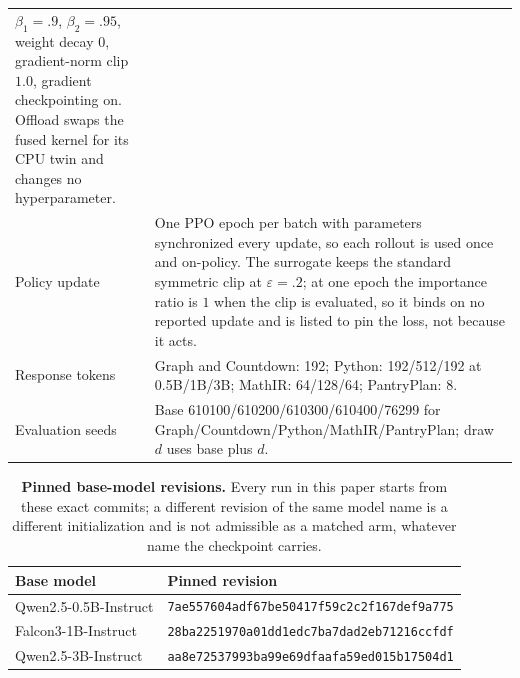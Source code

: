 \documentclass{article}
\newcommand{\1}{\mathbf 1}
\theoremstyle{remark}
\theoremstyle{definition}
\theoremstyle{plain}
\begin{document}
\begin{table}[!htbp]
\begin{tabularx}{\linewidth}{@{}P{.23\linewidth}Y@{}}
      $\beta_1=.9$, $\beta_2=.95$, weight decay $0$, gradient-norm clip $1.0$,
      gradient checkpointing on. Offload swaps the fused kernel for its CPU
      twin and changes no hyperparameter. \\
    Policy update & One PPO epoch per batch with parameters synchronized every
      update, so each rollout is used once and on-policy. The surrogate keeps
      the standard symmetric clip at $\varepsilon=.2$; at one epoch the
      importance ratio is $1$ when the clip is evaluated, so it binds on no
      reported update and is listed to pin the loss, not because it acts. \\
    Response tokens & Graph and Countdown: 192; Python: 192/512/192
      at 0.5B/1B/3B; MathIR: 64/128/64; PantryPlan: 8. \\
    Evaluation seeds & Base 610100/610200/610300/610400/76299 for
      Graph/Countdown/Python/MathIR/PantryPlan; draw $d$ uses base plus $d$. \\
    \bottomrule
  \end{tabularx}
\end{table}

\begin{table}[!htbp]
\centering
\caption{\textbf{Pinned base-model revisions.} Every run in this paper starts
from these exact commits; a different revision of the same model name is a
different initialization and is not admissible as a matched arm, whatever
name the checkpoint carries.}
\label{tab:pinned-revisions}
\small
\begin{tabular}{@{}ll@{}}
\toprule
\textbf{Base model} & \textbf{Pinned revision} \\
\midrule
Qwen2.5-0.5B-Instruct & {\scriptsize\texttt{7ae557604adf67be50417f59c2c2f167def9a775}} \\
Falcon3-1B-Instruct & {\scriptsize\texttt{28ba2251970a01dd1edc7ba7dad2eb71216ccfdf}} \\
Qwen2.5-3B-Instruct & {\scriptsize\texttt{aa8e72537993ba99e69dfaafa59ed015b17504d1}} \\
\bottomrule
\end{tabular}
\end{table}
\end{document}
